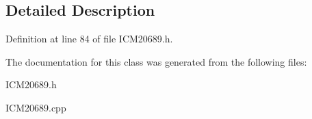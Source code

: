 \subsection{Detailed Description}


Definition at line 84 of file I\+C\+M20689.\+h.



The documentation for this class was generated from the following files\+:\begin{DoxyCompactItemize}
\item 
I\+C\+M20689.\+h\item 
I\+C\+M20689.\+cpp\end{DoxyCompactItemize}
